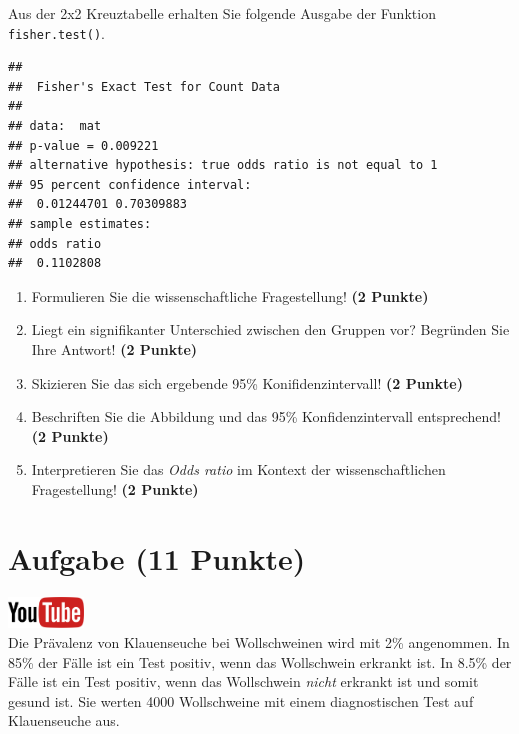 \documentclass[a4paper, 9pt]{scrartcl}\usepackage[]{graphicx}\usepackage[]{xcolor}
\makeatletter
\newenvironment{kframe}{%
 \def\at@end@of@kframe{}%
 \ifinner\ifhmode%
  \def\at@end@of@kframe{\end{minipage}}%
  \begin{minipage}{\columnwidth}%
 \fi\fi%
 \def\FrameCommand##1{\hskip\@totalleftmargin \hskip-\fboxsep
 \colorbox{shadecolor}{##1}\hskip-\fboxsep
     \hskip-\linewidth \hskip-\@totalleftmargin \hskip\columnwidth}%
 \MakeFramed {\advance\hsize-\width
   \@totalleftmargin\z@ \linewidth\hsize
   \@setminipage}}%
 {\par\unskip\endMakeFramed%
 \at@end@of@kframe}
\newenvironment{knitrout}{}{} %
\makeatother
\begin{document}
Aus der 2x2 Kreuztabelle erhalten Sie folgende \Rlogo Ausgabe der Funktion
\texttt{fisher.test()}.

\begin{knitrout}
\color{fgcolor}\begin{kframe}
\begin{verbatim}
## 
## 	Fisher's Exact Test for Count Data
## 
## data:  mat
## p-value = 0.009221
## alternative hypothesis: true odds ratio is not equal to 1
## 95 percent confidence interval:
##  0.01244701 0.70309883
## sample estimates:
## odds ratio 
##  0.1102808
\end{verbatim}
\end{kframe}
\end{knitrout}


\begin{enumerate}
\item Formulieren Sie die wissenschaftliche Fragestellung! \textbf{(2 Punkte)}
\item Liegt ein signifikanter Unterschied zwischen den Gruppen vor?
  Begr{\"u}nden Sie Ihre Antwort! \textbf{(2 Punkte)}
\item Skizieren Sie das sich ergebende 95\% Konifidenzintervall! \textbf{(2 Punkte)}
\item Beschriften Sie die Abbildung und
  das 95\% Konfidenzintervall entsprechend! \textbf{(2 Punkte)} 
\item Interpretieren Sie das \textit{Odds ratio} im Kontext der
  wissenschaftlichen Fragestellung! \textbf{(2 Punkte)} 
\end{enumerate}
 
\clearpage

\section{Aufgabe \hfill (11 Punkte)}

\hfill\href{https://youtu.be/VQlNl8hvRII}{\includegraphics[width =
  2cm]{img/youtube}}\\[1Ex]


Die Pr{\"a}valenz von Klauenseuche bei Wollschweinen wird mit
2\% angenommen. In 85\% der F{\"a}lle ist ein Test positiv, wenn das Wollschwein erkrankt
ist. In 8.5\% der F{\"a}lle ist ein Test positiv,
wenn das Wollschwein \textit{nicht} erkrankt ist und somit gesund ist. Sie
werten 4000 Wollschweine mit einem
diagnostischen Test auf Klauenseuche aus.
\end{document}
